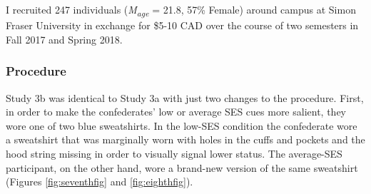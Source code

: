 \documentclass{sfuthesis}
\begin{document}
I recruited 247 individuals (\textit{M\textsubscript{age}} = 21.8, 57\% Female) around campus at Simon Fraser University in exchange for \$5-10 CAD over the course of two semesters in Fall 2017 and Spring 2018.

\subsubsection{Procedure}

Study 3b was identical to Study 3a with just two changes to the procedure. First, in order to make the confederates’ low or average SES cues more salient, they wore one of two blue sweatshirts. In the low-SES condition the confederate wore a sweatshirt that was marginally worn with holes in the cuffs and pockets and the hood string missing in order to visually signal lower status. The average-SES participant, on the other hand, wore a brand-new version of the same sweatshirt (Figures \ref{fig:seventhfig} and \ref{fig:eighthfig}). 
\end{document}
